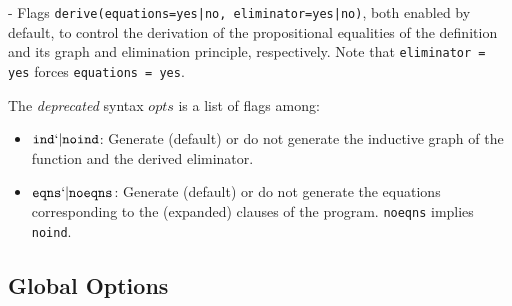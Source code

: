 - Flags \texttt{derive(equations=yes|no, eliminator=yes|no)}, both enabled by default,
  to control the derivation of the propositional equalities of the definition and its 
  graph and elimination principle, respectively. Note that \texttt{eliminator = yes} 
  forces \texttt{equations = yes}.

The \emph{deprecated} syntax $opts$ is a list of flags among:

\begin{itemize}
\item $\texttt{ind} `| \texttt{noind}$: Generate (default) or do not generate 
  the inductive graph of the function and the derived eliminator.
\item $\texttt{eqns} `| \texttt{noeqns}$: Generate (default) or do not generate 
  the equations corresponding to the (expanded) clauses of the program.
  \texttt{noeqns} implies \texttt{noind}.
\end{itemize}

\subsection{Global Options}

